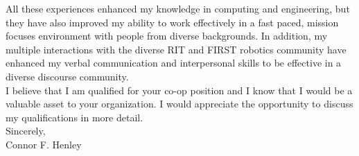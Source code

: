 \documentclass[line,margin]{res}
\begin{document}
\begin{resume}
\begin{adjustwidth}{-92pt}{0pt}
\noindent
All these experiences enhanced my knowledge in computing and engineering, but they have also improved my ability to work effectively in a fast paced, mission focuses environment with people from diverse backgrounds. In addition, my multiple interactions with the diverse RIT and FIRST robotics community have enhanced my verbal communication and interpersonal skills to be effective in a diverse discourse community. \\

\noindent
I believe that I am qualified for your co-op position and I know that I would be a valuable asset to your organization. I would appreciate the opportunity to discuss my qualifications in more detail. \\

Sincerely, \\
Connor F. Henley

\end{adjustwidth}
\end{resume}
\end{document}
